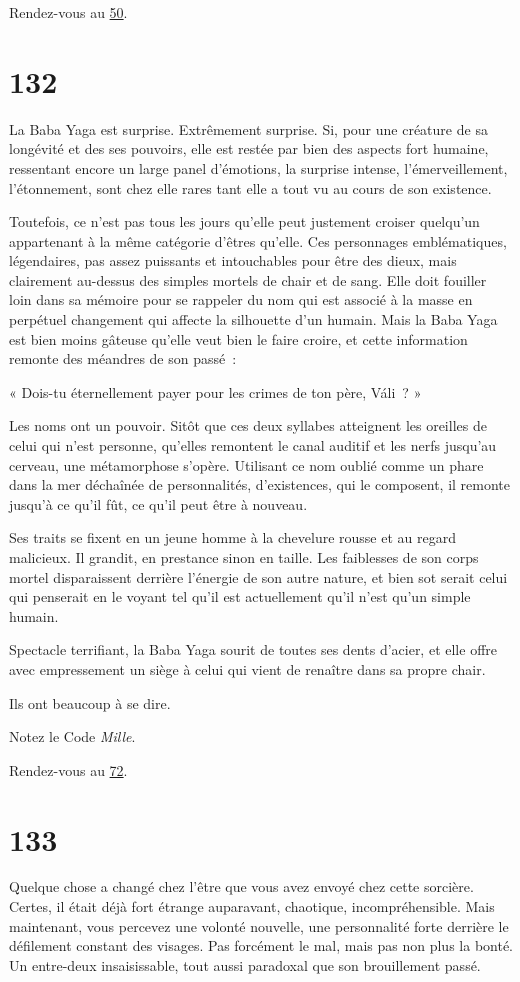 \documentclass{report}
\newcommand{\gsection}[1]{
    \section{#1}
    \label{section-#1}
}
\newcommand{\glink}[1]{\hyperref[section-#1]{#1}}
\begin{document}
Rendez-vous au \glink{50}.

\gsection{132}

La Baba Yaga est surprise. Extrêmement surprise. Si, pour une créature de sa longévité et des ses pouvoirs, elle est restée par bien des aspects fort humaine, ressentant encore un large panel d'émotions, la surprise intense, l'émerveillement, l'étonnement, sont chez elle rares tant elle a tout vu au cours de son existence.

Toutefois, ce n'est pas tous les jours qu'elle peut justement croiser quelqu'un appartenant à la même catégorie d'êtres qu'elle. Ces personnages emblématiques, légendaires, pas assez puissants et intouchables pour être des dieux, mais clairement au-dessus des simples mortels de chair et de sang. Elle doit fouiller loin dans sa mémoire pour se rappeler du nom qui est associé à la masse en perpétuel changement qui affecte la silhouette d'un humain. Mais la Baba Yaga est bien moins gâteuse qu'elle veut bien le faire croire, et cette information remonte des méandres de son passé :

« Dois-tu éternellement payer pour les crimes de ton père, Váli ? »

Les noms ont un pouvoir. Sitôt que ces deux syllabes atteignent les oreilles de celui qui n'est personne, qu'elles remontent le canal auditif et les nerfs jusqu'au cerveau, une métamorphose s'opère. Utilisant ce nom oublié comme un phare dans la mer déchaînée de personnalités, d'existences, qui le composent, il remonte jusqu'à ce qu'il fût, ce qu'il peut être à nouveau.

Ses traits se fixent en un jeune homme à la chevelure rousse et au regard malicieux. Il grandit, en prestance sinon en taille. Les faiblesses de son corps mortel disparaissent derrière l'énergie de son autre nature, et bien sot serait celui qui penserait en le voyant tel qu'il est actuellement qu'il n'est qu'un simple humain.

Spectacle terrifiant, la Baba Yaga sourit de toutes ses dents d'acier, et elle offre avec empressement un siège à celui qui vient de renaître dans sa propre chair.

Ils ont beaucoup à se dire.

Notez le Code \emph{Mille}.

Rendez-vous au \glink{72}.

\gsection{133}

Quelque chose a changé chez l'être que vous avez envoyé chez cette sorcière. Certes, il était déjà fort étrange auparavant, chaotique, incompréhensible. Mais maintenant, vous percevez une volonté nouvelle, une personnalité forte derrière le défilement constant des visages. Pas forcément le mal, mais pas non plus la bonté. Un entre-deux insaisissable, tout aussi paradoxal que son brouillement passé.
\end{document}
